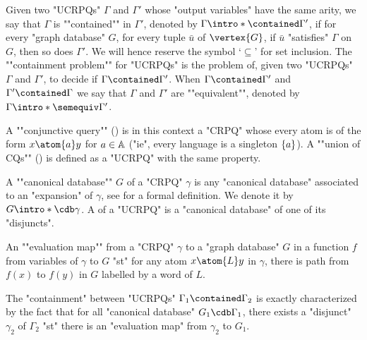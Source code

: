 \AP Given two "UCRPQs" $\Gamma$
and $\Gamma'$ whose "output variables" have the same arity,
we say that $\Gamma$ is \AP""contained"" in $\Gamma'$,
denoted by $\Gamma \intro*\contained \Gamma'$, if
for every "graph database" $G$, for every tuple $\bar u$ of $\vertex{G}$,
if $\bar u$ "satisfies" $\Gamma$ on $G$, then so does $\Gamma'$. We will hence reserve the symbol `$\subseteq$' for set inclusion.
The \AP""containment problem"" for "UCRPQs" is the problem of, given
two "UCRPQs" $\Gamma$ and $\Gamma'$, to decide if $\Gamma \contained \Gamma'$.
When $\Gamma \contained \Gamma'$ and $\Gamma' \contained \Gamma$  we say that
$\Gamma$ and $\Gamma'$ are \AP""equivalent"", denoted by
$\Gamma \intro*\semequiv \Gamma'$. 

\AP A ""conjunctive query"" () is in this context a "CRPQ" whose every atom is of the form $x \atom{a} y$ for $a \in \mathbb{A}$ ("ie", every language is a singleton $\{a\}$).
\AP A ""union of CQs"" () is defined as a "UCRPQ" with the same property.

A \AP""canonical database"" $G$ of a "CRPQ" $\gamma$ is any "canonical database" associated
to an "expansion" of $\gamma$, see \cite[Definition 3.1]{Florescu:CRPQ}
for a formal definition. We denote it by \AP$G \intro*\cdb \gamma$.
A  of a "UCRPQ" is a "canonical database" of one
of its "disjuncts".

An \AP""evaluation map"" from a "CRPQ" $\gamma$ to a "graph database" $G$
in a function $f$ from variables of $\gamma$ to $G$ "st"
for any atom $x \atom{L} y$ in $\gamma$, there is path from $f(x)$ to $f(y)$ in $G$
labelled by a word of $L$.

The "containment" between "UCRPQs" $\Gamma_1 \contained \Gamma_2$ is exactly characterized
by the fact that for all "canonical database" $G_1 \cdb \Gamma_1$,
there exists a "disjunct" $\gamma_2$ of $\Gamma_2$ "st" there is an "evaluation map"
from $\gamma_2$ to $G_1$.

